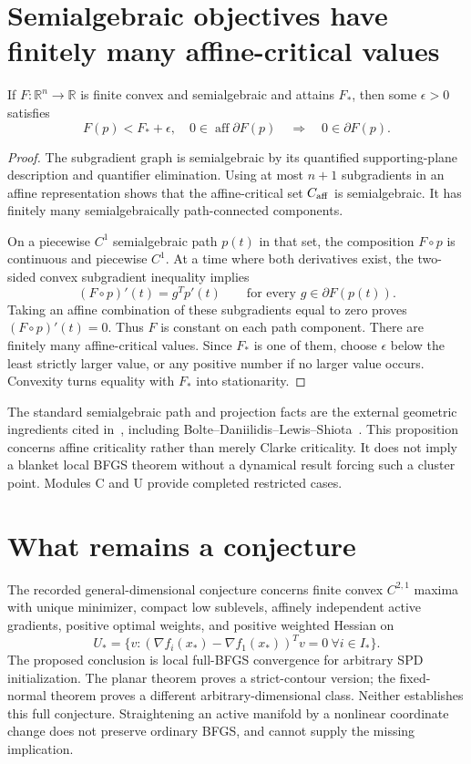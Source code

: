 \section{Semialgebraic objectives have finitely many affine-critical values}
\begin{proposition}\label{A:semialgebraic}
If $F:\mathbb R^n\to\mathbb R$ is finite convex and semialgebraic and attains $F_*$, then some $\epsilon>0$ satisfies
\[
 F(p)<F_*+\epsilon,\quad0\in\operatorname{aff}\partial F(p)
 \quad\Longrightarrow\quad0\in\partial F(p).
\]
\end{proposition}
\begin{proof}
The subgradient graph is semialgebraic by its quantified supporting-plane description and quantifier elimination. Using at most $n+1$ subgradients in an affine representation shows that the affine-critical set $C_{\rm aff}$ is semialgebraic. It has finitely many semialgebraically path-connected components.

On a piecewise $C^1$ semialgebraic path $p(t)$ in that set, the composition $F\circ p$ is continuous and piecewise $C^1$. At a time where both derivatives exist, the two-sided convex subgradient inequality implies
\[
 (F\circ p)'(t)=g^Tp'(t)\qquad\text{for every }g\in\partial F(p(t)).
\]
Taking an affine combination of these subgradients equal to zero proves $(F\circ p)'(t)=0$. Thus $F$ is constant on each path component. There are finitely many affine-critical values. Since $F_*$ is one of them, choose $\epsilon$ below the least strictly larger value, or any positive number if no larger value occurs. Convexity turns equality with $F_*$ into stationarity.
\end{proof}
The standard semialgebraic path and projection facts are the external geometric ingredients cited in~\cite{SA}, including Bolte--Daniilidis--Lewis--Shiota~\cite{BDLS}. This proposition concerns affine criticality rather than merely Clarke criticality. It does not imply a blanket local BFGS theorem without a dynamical result forcing such a cluster point. Modules C and U provide completed restricted cases.

\section{What remains a conjecture}
The recorded general-dimensional conjecture concerns finite convex $C^{2,1}$ maxima with unique minimizer, compact low sublevels, affinely independent active gradients, positive optimal weights, and positive weighted Hessian on
\[
 U_* =\{v:(\nabla f_i(x_*)-\nabla f_1(x_*))^Tv=0\ \forall i\in I_*\}.
\]
The proposed conclusion is local full-BFGS convergence for arbitrary SPD initialization. The planar theorem proves a strict-contour version; the fixed-normal theorem proves a different arbitrary-dimensional class. Neither establishes this full conjecture. Straightening an active manifold by a nonlinear coordinate change does not preserve ordinary BFGS, and cannot supply the missing implication.

